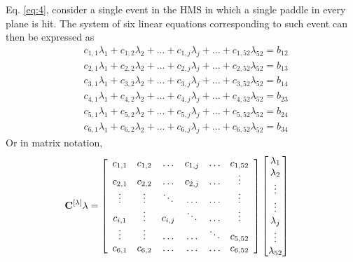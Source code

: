 \documentclass[14pt]{article}
\begin{document}
\begin{itemize}
Eq. \ref{eq:4}, consider a single event in the HMS in which a single paddle in every plane is hit. The system of six linear equations
corresponding to such event can then be expressed as
\begin{equation} \label{eq:5}
\begin{split}
  &c_{1,1}\lambda_{1} +  c_{1,2}\lambda_{2} + . . . + c_{1,j}\lambda_{j} + . . . + c_{1,52}\lambda_{52} =  b_{12} \\
  &c_{2,1}\lambda_{1} +  c_{2,2}\lambda_{2} + . . . + c_{2,j}\lambda_{j} + . . . + c_{2,52}\lambda_{52} =  b_{13} \\
  &c_{3,1}\lambda_{1} +  c_{3,2}\lambda_{2} + . . . + c_{3,j}\lambda_{j} + . . . + c_{3,52}\lambda_{52} =  b_{14} \\
  &c_{4,1}\lambda_{1} +  c_{4,2}\lambda_{2} + . . . + c_{4,j}\lambda_{j} + . . . + c_{4,52}\lambda_{52} =  b_{23} \\
  &c_{5,1}\lambda_{1} +  c_{5,2}\lambda_{2} + . . . + c_{5,j}\lambda_{j} + . . . + c_{5,52}\lambda_{52} =  b_{24} \\
  &c_{6,1}\lambda_{1} +  c_{6,2}\lambda_{2} + . . . + c_{6,j}\lambda_{j} + . . . + c_{6,52}\lambda_{52} =  b_{34}
\end{split}
\end{equation}
Or in matrix notation,
\begin{align}
\bf{C^{[\lambda]}}\lambda &= \left[\begin{array}{cccccc}
  c_{1,1} & c_{1,2} & \hdots & c_{1,j} & \hdots & c_{1,52} \\
  c_{2,1} & c_{2,2} & \hdots & c_{2,j} & \hdots & \vdots \\
    \vdots & \vdots & \ddots & \hdots & \hdots & \vdots \\
  c_{i,1} & \vdots & c_{i,j} & \ddots & \hdots & \vdots \\
    \vdots & \vdots & \hdots & \hdots & \ddots & c_{5,52} \\
    c_{6,1} & c_{6,2} & \hdots & \hdots & \hdots & c_{6,52} \\
  \end{array}\right]
\begin{bmatrix}
  \lambda_{1}  \\
  \lambda_{2}  \\
  \vdots \\
  \vdots \\
  \lambda_{j} \\
  \vdots \\
  \lambda_{52}
\end{bmatrix} 

\end{align}
\end{itemize}
\end{document}
